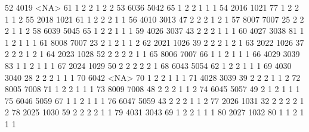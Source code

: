 \documentclass[
  letterpaper,
  DIV=11,
  numbers=noendperiod]{scrreprt}
\newenvironment{Shaded}{\begin{snugshade}}{\end{snugshade}}
\newcommand{\NormalTok}[1]{\textcolor[rgb]{0.00,0.23,0.31}{#1}}
\begin{document}
\begin{Shaded}
\begin{Highlighting}[]
\NormalTok{52  4019 \textless{}NA\textgreater{}  61          1      2        2         1    2                 2}
\NormalTok{53  6036 5042  65          1      2        2         1    1                 1}
\NormalTok{54  2016 1021  77          1      2        2         1    1                 2}
\NormalTok{55  2018 1021  61          1      2        2         2    1                 1}
\NormalTok{56  4010 3013  47          2      2        2         1    2                 1}
\NormalTok{57  8007 7007  25          2      2        2         1    1                 2}
\NormalTok{58  6039 5045  65          1      2        2         1    1                 1}
\NormalTok{59  4026 3037  43          2      2        2         1    1                 1}
\NormalTok{60  4027 3038  81          1      1        2         1    1                 1}
\NormalTok{61  8008 7007  23          2      1        2         1    1                 2}
\NormalTok{62  2021 1026  39          2      2        2         1    2                 1}
\NormalTok{63  2022 1026  37          2      2        2         1    2                 1}
\NormalTok{64  2023 1028  52          2      2        2         2    1                 1}
\NormalTok{65  8006 7007  66          1      1        2         1    1                 1}
\NormalTok{66  4029 3039  83          1      1        2         1    1                 1}
\NormalTok{67  2024 1029  50          2      2        2         2    2                 1}
\NormalTok{68  6043 5054  62          1      2        2         1    1                 1}
\NormalTok{69  4030 3040  28          2      2        2         1    1                 1}
\NormalTok{70  6042 \textless{}NA\textgreater{}  70          1      2        2         1    1                 1}
\NormalTok{71  4028 3039  39          2      2        2         1    1                 2}
\NormalTok{72  8005 7008  71          1      2        2         1    1                 1}
\NormalTok{73  8009 7008  48          2      2        2         1    1                 2}
\NormalTok{74  6045 5057  49          2      1        2         1    1                 1}
\NormalTok{75  6046 5059  67          1      1        2         1    1                 1}
\NormalTok{76  6047 5059  43          2      2        2         1    1                 2}
\NormalTok{77  2026 1031  32          2      2        2         2    1                 2}
\NormalTok{78  2025 1030  59          2      2        2         2    1                 1}
\NormalTok{79  4031 3043  69          1      2        2         1    1                 1}
\NormalTok{80  2027 1032  80          1      1        2         1    1                 1}

\end{Highlighting}
\end{Shaded}
\end{document}

